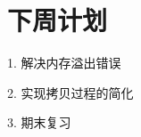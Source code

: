 \documentclass{article}
\begin{document}


\section{下周计划}
1. 解决内存溢出错误

2. 实现拷贝过程的简化

3. 期末复习
\end{document}

